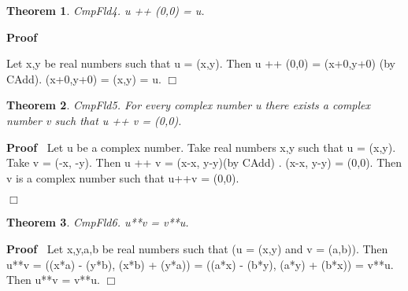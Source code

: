 \documentclass{article}
\newenvironment{forthel}{\begin{leftbar}}{\end{leftbar}}
\newenvironment{proof}{\noindent\textbf{Proof\ }}{\hspace*{\fill}$\Box$\medskip}
\newtheorem{theorem}{Theorem}
\begin{document}
\begin{forthel}
\begin{theorem}
 CmpFld4. u ++ (0,0) = u.
\end{theorem}\begin{proof}
 
Let x,y be real numbers such that u = (x,y). Then u ++ (0,0) = (x+0,y+0) (by CAdd). (x+0,y+0) = (x,y) = u. 
\end{proof}




\begin{theorem}
 CmpFld5. For every complex number u there exists a complex number v such that u ++ v = (0,0).
\end{theorem}\begin{proof}
 Let u be a complex number.
Take real numbers x,y such that u = (x,y). Take v = (-x, -y). Then  u ++ v = (x-x, y-y)(by CAdd) . (x-x, y-y) = (0,0). 
Then v is a complex number such that u++v = (0,0).

\end{proof}


\begin{theorem}
 CmpFld6. u**v = v**u.
\end{theorem}\begin{proof}
 Let x,y,a,b be real numbers such that (u = (x,y) and v = (a,b)).
Then u**v =  ((x*a) - (y*b), (x*b) + (y*a)) =  ((a*x) - (b*y), (a*y) + (b*x)) = v**u. Then u**v = v**u. \end{proof}



\end{forthel}
\end{document}
